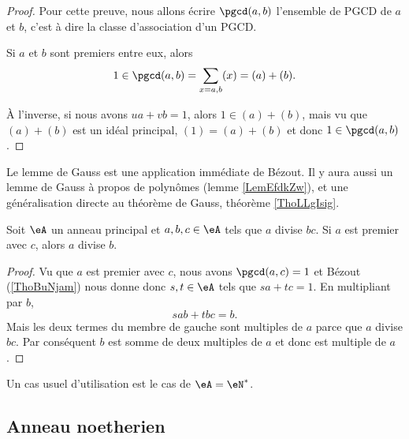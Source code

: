 \begin{proof}
    Pour cette preuve, nous allons écrire \( \pgcd(a,b)\) l'ensemble de PGCD de \( a\) et \( b\), c'est à dire la classe d'association d'un PGCD.

    Si \( a\) et \( b\) sont premiers entre eux, alors
    \begin{equation}
        1\in\pgcd(a,b)=\sum_{x=a,b}(x)=(a)+(b).
    \end{equation}
    
    À l'inverse, si nous avons \( ua+vb=1\), alors \( 1\in (a)+(b)\), mais vu que \( (a)+(b)\) est un idéal principal, \( (1)=(a)+(b)\) et donc \( 1\in \pgcd(a,b)\).
\end{proof}

Le lemme de Gauss est une application immédiate de Bézout. Il y aura aussi un lemme de Gauss à propos de polynômes (lemme \ref{LemEfdkZw}), et une généralisation directe au théorème de Gauss, théorème \ref{ThoLLgIsig}.
\begin{lemma}    \label{LemSdnZNX}
    Soit \( \eA\) un anneau principal et \( a,b,c\in \eA\) tels que \( a\) divise \( bc\). Si \( a\) est premier avec \( c\), alors \( a\) divise \( b\).
\end{lemma}

\begin{proof}
    Vu que \( a\) est premier avec \( c\), nous avons \( \pgcd(a,c)=1\) et Bézout (\ref{ThoBuNjam}) nous donne donc \( s,t\in \eA\) tels que \( sa+tc=1\). En multipliant par \( b\),
    \begin{equation}
        sab+tbc=b.
    \end{equation}
    Mais les deux termes du membre de gauche sont multiples de \( a\) parce que \( a\) divise \( bc\). Par conséquent \( b\) est somme de deux multiples de \( a\) et donc est multiple de \( a\).
\end{proof}
Un cas usuel d'utilisation est le cas de \( \eA=\eN^*\).

\subsection{Anneau noetherien}

